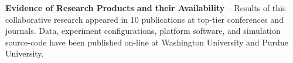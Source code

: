 \textbf{Evidence of Research Products and their Availability} -- Results of this 
collaborative research appeared in 10 publications at top-tier conferences and journals.
Data, experiment configurations, platform software, and simulation source-code 
have been published on-line at Washington University and Purdue University.

